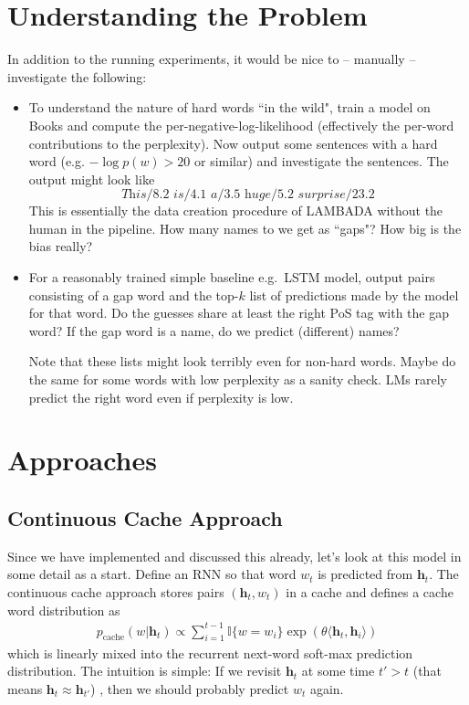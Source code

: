 \documentclass[a4paper,10pt]{article}
\newcommand\h{\mathbf h}
\begin{document}
\section{Understanding the Problem}
In addition to the running experiments, it would be nice to -- manually -- investigate the following:
\begin{itemize}
	\item To understand the nature of hard words ``in the wild", train a model on Books and compute the per-negative-log-likelihood (effectively the per-word contributions to the perplexity). Now output some sentences with a hard word (e.g. $-\log p(w)>20$ or similar) and investigate the sentences. The output might look like
	$$\textit{This$/8.2$ is$/4.1$ a$/3.5$ huge$/5.2$ surprise$/23.2$}$$ 
	This is essentially the data creation procedure of LAMBADA without the human in the pipeline. How many names to we get as ``gaps"? How big is the bias really? 
	\item For a reasonably trained simple baseline e.g.\ LSTM model, output pairs consisting of a gap word and the top-$k$ list of predictions made by the model for that word. Do the guesses share at least the right PoS tag with the gap word? If the gap word is a name, do we predict (different) names?
	
	Note that these lists might look terribly even for non-hard words. Maybe do the same for some words with low perplexity as a sanity check. LMs rarely predict the right word even if perplexity is low.
\end{itemize}

\section{Approaches}
\subsection{Continuous Cache Approach}
Since we have implemented and discussed this already, let's look at this model in some detail as a start. Define an RNN so that word $w_t$ is predicted from $\h_t$. The continuous cache approach \cite{grave16} stores pairs $(\h_t, w_t)$ in a cache and defines a cache word distribution as 
\begin{align}
	p_\text{cache}(w|\h_t)\propto\sum_{i=1}^{t-1}\mathbb I\lbrace w=w_i\rbrace\exp(\theta \langle \h_t,\h_i\rangle)
\end{align}
which is linearly mixed into the recurrent next-word soft-max prediction distribution. The intuition is simple: If we revisit $\h_t$ at some time $t'>t$ (that means $\h_t\approx \h_{t'}$) , then we should probably predict $w_t$ again.
\end{document}
